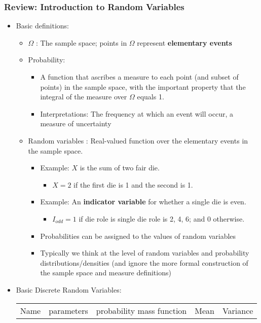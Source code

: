 \documentclass[12pt]{report}
\begin{document}
\subsubsection*{Review: Introduction to Random Variables}
\label{sec-1-1-4}
\begin{itemize}
\item Basic definitions:
\label{sec-1-1-4-1}
\begin{itemize}
\item $\Omega$ : The sample space; points in $\Omega$ represent \textbf{elementary events}
\item Probability:
\begin{itemize}
\item A function that ascribes a measure to each point (and subset of points)
in the sample space, with the important property that the integral of the measure over $\Omega$ equals 1.
\item Interpretations: The frequency at which an event will occur, a measure of uncertainty
\end{itemize}
\item Random variables : Real-valued function over the elementary events in the sample space.
\begin{itemize}
\item Example: $X$ is the sum of two fair die.
\begin{itemize}
\item $X=2$ if the first die is 1 and the second is 1.
\end{itemize}
\item Example: An \textbf{indicator variable} for whether a single die is even.
\begin{itemize}
\item $I_{odd}=1$ if die role is single die role is 2, 4, 6; and 0 otherwise.
\end{itemize}
\item Probabilities can be assigned to the values of random variables
\item Typically we think at the level of random variables and probability
distributions/densities (and ignore the more formal construction of the
sample space and measure definitions)
\end{itemize}
\end{itemize}
\item Basic Discrete Random Variables:
\label{sec-1-1-4-2}
\begin{center}
\begin{tabular}{lllll}
\hline
Name & parameters & probability mass function & Mean & Variance\\

\end{tabular}
\end{center}
\end{itemize}
\end{document}
